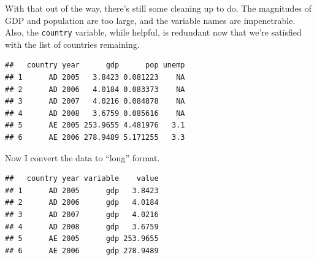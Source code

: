\documentclass[12pt,oneside,openany]{book}
\newenvironment{Shaded}{\begin{snugshade}}{\end{snugshade}}
\newcommand{\KeywordTok}[1]{\textcolor[rgb]{0.13,0.29,0.53}{\textbf{#1}}}
\newcommand{\DataTypeTok}[1]{\textcolor[rgb]{0.13,0.29,0.53}{#1}}
\newcommand{\FloatTok}[1]{\textcolor[rgb]{0.00,0.00,0.81}{#1}}
\newcommand{\StringTok}[1]{\textcolor[rgb]{0.31,0.60,0.02}{#1}}
\newcommand{\OperatorTok}[1]{\textcolor[rgb]{0.81,0.36,0.00}{\textbf{#1}}}
\newcommand{\NormalTok}[1]{#1}
\begin{document}
With that out of the way, there's still some cleaning up to do. The
magnitudes of GDP and population are too large, and the variable names
are impenetrable. Also, the \texttt{country} variable, while helpful, is
redundant now that we're satisfied with the list of countries remaining.

\begin{Shaded}
\end{Shaded}

\begin{verbatim}
##   country year      gdp      pop unemp
## 1      AD 2005   3.8423 0.081223    NA
## 2      AD 2006   4.0184 0.083373    NA
## 3      AD 2007   4.0216 0.084878    NA
## 4      AD 2008   3.6759 0.085616    NA
## 5      AE 2005 253.9655 4.481976   3.1
## 6      AE 2006 278.9489 5.171255   3.3
\end{verbatim}

Now I convert the data to ``long'' format.

\begin{Shaded}
\end{Shaded}

\begin{verbatim}
##   country year variable    value
## 1      AD 2005      gdp   3.8423
## 2      AD 2006      gdp   4.0184
## 3      AD 2007      gdp   4.0216
## 4      AD 2008      gdp   3.6759
## 5      AE 2005      gdp 253.9655
## 6      AE 2006      gdp 278.9489
\end{verbatim}
\end{document}
